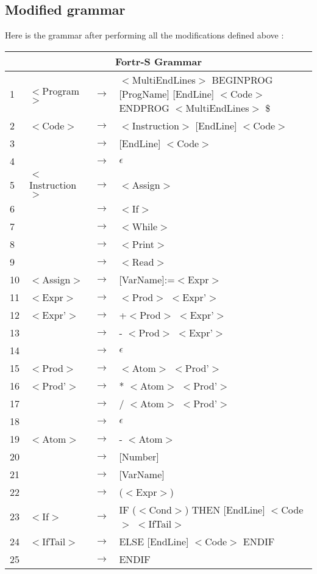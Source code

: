 \documentclass{article}
\begin{document}
\subsection{Modified grammar}
Here is the grammar after performing all the modifications defined above :
\begin{center}
\begin{tabular}{|m{0.5cm} m{2.5cm} m{0.5cm} m{12cm}|}
\hline
\multicolumn{4}{|c|}{Fortr-S Grammar}\\
\hline\hline
1 & $<$Program$>$ & $\to$ & $<$MultiEndLines$>$ BEGINPROG [ProgName] [EndLine] $<$Code$>$ ENDPROG $<$MultiEndLines$>$ \$ \\

2 & $<$Code$>$ & $\to$ & $<$Instruction$>$ [EndLine] $<$Code$>$ \\
3 & & $\to$ & [EndLine] $<$Code$>$ \\
4 & & $\to$ & $\epsilon$ \\

5 & $<$Instruction$>$ & $\to$ & $<$Assign$>$\\
6 & & $\to$ & $<$If$>$\\
7 & & $\to$ & $<$While$>$\\
8 & & $\to$ & $<$Print$>$\\
9 & & $\to$ & $<$Read$>$\\
10 & $<$Assign$>$ & $\to$ & [VarName]:=$<$Expr$>$\\

11 & $<$Expr$>$ & $\to$ & $<$Prod$>$ $<$Expr'$>$\\
12 & $<$Expr'$>$ & $\to$ & +$<$Prod$>$ $<$Expr'$>$\\
13 & & $\to$ & - $<$Prod$>$ $<$Expr'$>$\\
14 & & $\to$ & $\epsilon$\\
15 & $<$Prod$>$ & $\to$ & $<$Atom$>$ $<$Prod'$>$ \\
16 & $<$Prod'$>$ & $\to$ & * $<$Atom$>$ $<$Prod'$>$ \\
17 & & $\to$ & / $<$Atom$>$ $<$Prod'$>$\\
18 & & $\to$ & $\epsilon$\\
19 & $<$Atom$>$ & $\to$ & - $<$Atom$>$ \\
20 & & $\to$ & [Number]\\
21 & & $\to$ & [VarName]\\
22 & & $\to$ & ($<$Expr$>$)\\

23 & $<$If$>$ & $\to$ & IF ($<$Cond$>$) THEN [EndLine] $<$Code$>$ $<$IfTail$>$\\
24 & $<$IfTail$>$ & $\to$ & ELSE [EndLine] $<$Code$>$ ENDIF\\
25 & & $\to$ & ENDIF\\


\end{tabular}
\end{center}
\end{document}
